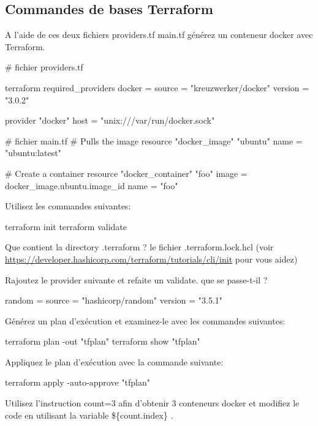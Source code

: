 \subsection{Commandes de bases Terraform}
\begin{questions}
    
\question A l'aide de ces deux fichiers providers.tf main.tf générez un conteneur docker avec Terraform. 

\begin{terraformcode}
    # fichier providers.tf

    terraform {
        required_providers {
          docker = {
            source  = "kreuzwerker/docker"
            version = "3.0.2"
          }
        }
      }

    provider "docker" {
        host = "unix:///var/run/docker.sock"
    }

\end{terraformcode}

\begin{terraformcode} 
      # fichier main.tf    
      # Pulls the image
      resource "docker_image" "ubuntu" {
        name = "ubuntu:latest"
      }
      
      # Create a container
      resource "docker_container" "foo" {
        image = docker_image.ubuntu.image_id
        name  = "foo"
      }
\end{terraformcode}

Utilisez les commandes suivantes:
\begin{bashcode}
  terraform init 
  terraform validate
\end{bashcode}

\question Que contient la directory .terraform ? le fichier .terraform.lock.hcl (voir \url{https://developer.hashicorp.com/terraform/tutorials/cli/init} pour vous aidez)

\question Rajoutez le provider suivante et refaite un validate. que se passe-t-il ?

\begin{terraformcode}
random = {
  source  = "hashicorp/random"
  version = "3.5.1"
}
\end{terraformcode}
\question Générez un plan d'exécution et examinez-le avec les commandes suivantes:

\begin{bashcode}
terraform plan -out "tfplan"
terraform show "tfplan"
\end{bashcode}

\question Appliquez le plan d'exécution avec la commande suivante:

\begin{bashcode}
terraform  apply -auto-approve "tfplan"
\end{bashcode}

\question Utilisez l'instruction count=3 afin d'obtenir 3 conteneurs docker et modifiez le code en utilisant la variable \$\{count.index\} .

\question 
\end{questions}

